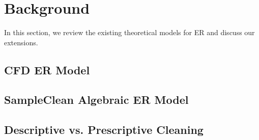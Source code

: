 \section{Background}
In this section, we review the existing theoretical models for ER and 
discuss our extensions.

\subsection{CFD ER Model}

\subsection{SampleClean Algebraic ER Model}

\subsection{Descriptive vs. Prescriptive Cleaning}










